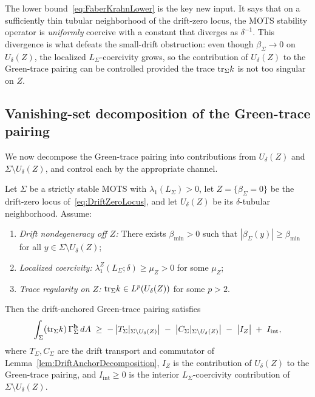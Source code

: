 \begin{remark}\label{rem:LocalizationHelps}
The lower bound~\eqref{eq:FaberKrahnLower} is the key new input. It says that on a sufficiently thin tubular neighborhood of the drift-zero locus, the MOTS stability operator is \emph{uniformly} coercive with a constant that diverges as $\delta^{-1}$. This divergence is what defeats the small-drift obstruction: even though $\beta_\Sigma\to0$ on $U_\delta(Z)$, the localized $L_\Sigma$-coercivity grows, so the contribution of $U_\delta(Z)$ to the Green-trace pairing can be controlled provided the trace $\mathrm{tr}_\Sigma k$ is not too singular on $Z$.
\end{remark}

\subsection{Vanishing-set decomposition of the Green-trace pairing}

We now decompose the Green-trace pairing into contributions from $U_\delta(Z)$ and $\Sigma\setminus U_\delta(Z)$, and control each by the appropriate channel.

\begin{theorem}\label{thm:VanishingSetDecomposition}
Let $\Sigma$ be a strictly stable MOTS with $\lambda_1(L_\Sigma)>0$, let $Z=\{\beta_\Sigma=0\}$ be the drift-zero locus of~\eqref{eq:DriftZeroLocus}, and let $U_\delta(Z)$ be its $\delta$-tubular neighborhood. Assume:
\begin{enumerate}
    \item[\textup{(H1)}] \emph{Drift nondegeneracy off $Z$:} There exists $\beta_{\min}>0$ such that $|\beta_\Sigma(y)|\ge\beta_{\min}$ for all $y\in\Sigma\setminus U_\delta(Z)$;
    \item[\textup{(H2)}] \emph{Localized coercivity:} $\lambda_1^Z(L_\Sigma;\delta)\ge\mu_Z>0$ for some $\mu_Z$;
    \item[\textup{(H3)}] \emph{Trace regularity on $Z$:} $\mathrm{tr}_\Sigma k\in L^p(U_\delta(Z))$ for some $p>2$.
\end{enumerate}
Then the drift-anchored Green-trace pairing satisfies
\begin{equation}\label{eq:VanishingSetDecomposition}
    \int_\Sigma(\mathrm{tr}_\Sigma k)\,\Gamma_\Sigma^{\mathbf b}\,dA
    \;\ge\;
    -\,\bigl|T_\Sigma|_{\Sigma\setminus U_\delta(Z)}\bigr|
    \;-\;\bigl|C_\Sigma|_{\Sigma\setminus U_\delta(Z)}\bigr|
    \;-\;\bigl|I_Z\bigr|
    \;+\;I_{\mathrm{int}},
\end{equation}
where $T_\Sigma,C_\Sigma$ are the drift transport and commutator of Lemma~\ref{lem:DriftAnchorDecomposition}, $I_Z$ is the contribution of $U_\delta(Z)$ to the Green-trace pairing, and $I_{\mathrm{int}}\ge0$ is the interior $L_\Sigma$-coercivity contribution of $\Sigma\setminus U_\delta(Z)$.
\end{theorem}

